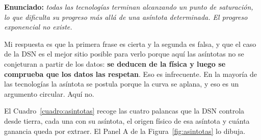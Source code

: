 \documentclass[11pt,letterpaper]{article}
\begin{document}
\textbf{Enunciado:} \emph{todas las tecnologías terminan alcanzando un punto de
saturación, lo que dificulta su progreso más allá de una asíntota determinada.
El progreso exponencial no existe.}

Mi respuesta es que la primera frase es cierta y la segunda es falsa, y que el
caso de la DSN es el mejor sitio posible para verlo porque aquí las asíntotas
no se conjeturan a partir de los datos: \textbf{se deducen de la física y
luego se comprueba que los datos las respetan}. Eso es infrecuente. En la
mayoría de las tecnologías la asíntota se postula porque la curva se aplana, y
eso es un argumento circular. Aquí no.

El Cuadro~\ref{cuadro:asintotas} recoge las cuatro palancas que la DSN
controla desde tierra, cada una con su asíntota, el origen físico de esa
asíntota y cuánta ganancia queda por extraer. El Panel A de la
Figura~\ref{fig:asintotas} lo dibuja.
\end{document}
